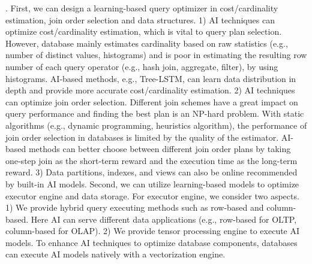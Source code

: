 

. 
First, we can design a learning-based query optimizer in cost/cardinality estimation, join order selection and data structures. 1) AI techniques can optimize cost/cardinality estimation, which is vital to query plan selection. However, database mainly estimates cardinality based on raw statistics (e.g., number of distinct values, histograms)  and is poor in estimating the resulting row number of each query operator (e.g., hash join, aggregate, filter), by using histograms. AI-based methods, e.g., Tree-LSTM, can learn data distribution in depth and provide more accurate cost/cardinality estimation. 2) AI techniques can optimize join order selection. Different join schemes have a great impact on query performance and finding the best plan is an NP-hard problem. With static algorithms (e.g., dynamic programming, heuristics algorithm), the performance of join order selection in databases is limited by the quality of the estimator. AI-based methods can better choose between different join order plans by taking one-step join as the short-term reward and the execution time as the long-term reward. 3) Data partitions, indexes, and views can also be online recommended by built-in AI models.  
Second, we can utilize learning-based models to optimize executor engine and data storage. For executor engine, we consider two aspects. 1) We provide hybrid query executing methods such as row-based and column-based. Here AI can serve different data applications (e.g., row-based for OLTP, column-based for OLAP). 2) We provide tensor processing engine to execute AI models. To enhance AI techniques to optimize database components, databases can execute AI models natively with a vectorization engine. %

